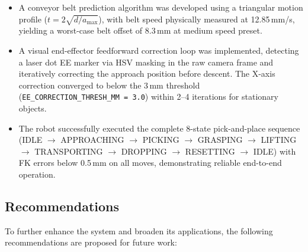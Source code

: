 \begin{itemize}
    \item A conveyor belt prediction algorithm was developed using a triangular motion profile ($t = 2\sqrt{d/a_{\max}}$), with belt speed physically measured at 12.85\,mm/s, yielding a worst-case belt offset of 8.3\,mm at medium speed preset.

    \item A visual end-effector feedforward correction loop was implemented, detecting a laser dot EE marker via HSV masking in the raw camera frame and iteratively correcting the approach position before descent. The X-axis correction converged to below the 3\,mm threshold (\texttt{EE\_CORRECTION\_THRESH\_MM = 3.0}) within 2--4 iterations for stationary objects.

    \item The robot successfully executed the complete 8-state pick-and-place sequence (IDLE $\to$ APPROACHING $\to$ PICKING $\to$ GRASPING $\to$ LIFTING $\to$ TRANSPORTING $\to$ DROPPING $\to$ RESETTING $\to$ IDLE) with FK errors below 0.5\,mm on all moves, demonstrating reliable end-to-end operation.
\end{itemize}

\subsection{Recommendations}
\hspace{1.27cm}
To further enhance the system and broaden its applications, the following recommendations are proposed for future work:


